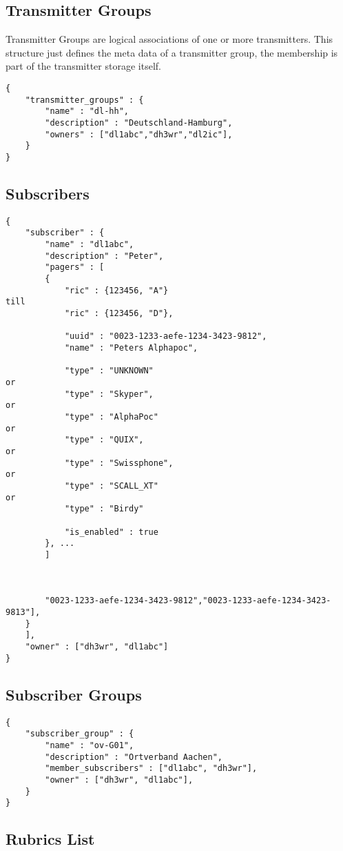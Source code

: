 \documentclass[a4paper]{article}
\begin{document}
\subsection{Transmitter Groups}
Transmitter Groups are logical associations of one or more transmitters. This structure just defines the meta data of a transmitter group, the membership is part of the transmitter storage itself.

\begin{lstlisting}
{
    "transmitter_groups" : {
        "name" : "dl-hh",
        "description" : "Deutschland-Hamburg",
        "owners" : ["dl1abc","dh3wr","dl2ic"],
    }
}
\end{lstlisting}

    
\subsection{Subscribers}
\begin{lstlisting}
{
    "subscriber" : {
        "name" : "dl1abc",
        "description" : "Peter",
        "pagers" : [
		{
        	"ric" : {123456, "A"}
till
			"ric" : {123456, "D"},

			"uuid" : "0023-1233-aefe-1234-3423-9812",
    		"name" : "Peters Alphapoc",

			"type" : "UNKNOWN"
or
			"type" : "Skyper",
or
			"type" : "AlphaPoc"
or
			"type" : "QUIX",
or
			"type" : "Swissphone",
or
			"type" : "SCALL_XT"
or
			"type" : "Birdy"

			"is_enabled" : true
        }, ...
        ]
        
        
        
        "0023-1233-aefe-1234-3423-9812","0023-1233-aefe-1234-3423-9813"],
    }
    ],
    "owner" : ["dh3wr", "dl1abc"]
}
\end{lstlisting}

\subsection{Subscriber Groups}

\begin{lstlisting}
{
    "subscriber_group" : {
        "name" : "ov-G01",
        "description" : "Ortverband Aachen",
        "member_subscribers" : ["dl1abc", "dh3wr"],
    	"owner" : ["dh3wr", "dl1abc"],
    }
}
\end{lstlisting}

\subsection{Rubrics List}
\label{rubric_list}
\end{document}
